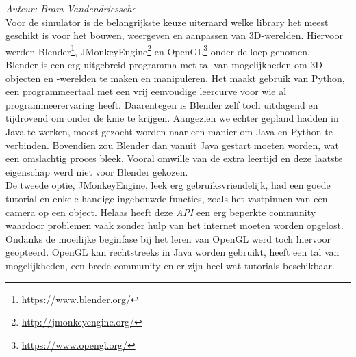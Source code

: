 {\em Auteur: Bram Vandendriessche}\\


\noindent
Voor de simulator is de belangrijkste keuze uiteraard welke library het meest geschikt is voor het bouwen, weergeven en aanpassen van 3D-werelden. Hiervoor werden Blender\footnote{\url{https://www.blender.org/}}, JMonkeyEngine\footnote{\url{http://jmonkeyengine.org/}} en OpenGL\footnote{\url{https://www.opengl.org/}} onder de loep genomen. 
\\
Blender is een erg uitgebreid programma met tal van mogelijkheden om 3D-objecten en -werelden te maken en manipuleren. Het maakt gebruik van Python, een programmeertaal met een vrij eenvoudige leercurve voor wie al programmeerervaring heeft. Daarentegen is Blender zelf toch uitdagend en tijdrovend om onder de knie te krijgen. Aangezien we echter gepland hadden in Java te werken, moest gezocht worden naar een manier om Java en Python te verbinden. Bovendien zou Blender dan vanuit Java gestart moeten worden, wat een omslachtig proces bleek. Vooral omwille van de extra leertijd en deze laatste eigenschap werd niet voor Blender gekozen. \\
De tweede optie, JMonkeyEngine, leek erg gebruiksvriendelijk, had een goede tutorial en enkele handige ingebouwde functies, zoals het vastpinnen van een camera op een object. Helaas heeft deze \textit{API} een erg beperkte community waardoor problemen vaak zonder hulp van het internet moeten worden opgelost. 
\\
Ondanks de moeilijke beginfase bij het leren van OpenGL werd toch hiervoor geopteerd. OpenGL kan rechtstreeks in Java worden gebruikt, heeft een tal van mogelijkheden, een brede community en er zijn heel wat tutorials beschikbaar. 


